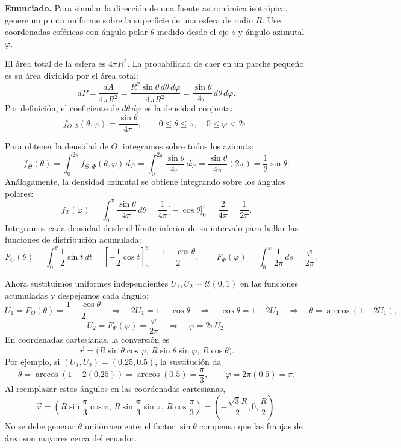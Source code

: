 \textbf{Enunciado.} Para simular la dirección de una fuente astronómica
isotrópica, genere un punto uniforme sobre la superficie de una esfera de
radio $R$. Use coordenadas esféricas con ángulo polar $\theta$ medido desde
el eje $z$ y ángulo azimutal $\varphi$.

El área total de la esfera es $4\pi R^2$. La probabilidad de caer en un
parche pequeño es su área dividida por el área total:
\[
    dP=\frac{dA}{4\pi R^2}
    =\frac{R^2\sin\theta\,d\theta\,d\varphi}{4\pi R^2}
    =\frac{\sin\theta}{4\pi}\,d\theta\,d\varphi.
\]
Por definición, el coeficiente de $d\theta\,d\varphi$ es la densidad conjunta:
\[
    f_{\Theta,\Phi}(\theta,\varphi)=\frac{\sin\theta}{4\pi},
    \qquad 0\leq\theta\leq\pi,\quad 0\leq\varphi<2\pi.
\]

Para obtener la densidad de $\Theta$, integramos sobre todos los azimuts:
\[
    f_\Theta(\theta)
    =\int_0^{2\pi}f_{\Theta,\Phi}(\theta,\varphi)\,d\varphi
    =\int_0^{2\pi}\frac{\sin\theta}{4\pi}\,d\varphi
    =\frac{\sin\theta}{4\pi}(2\pi)
    =\frac{1}{2}\sin\theta.
\]
Análogamente, la densidad azimutal se obtiene integrando sobre los ángulos
polares:
\[
    f_\Phi(\varphi)
    =\int_0^\pi\frac{\sin\theta}{4\pi}\,d\theta
    =\frac{1}{4\pi}\bigl[-\cos\theta\bigr]_0^\pi
    =\frac{2}{4\pi}
    =\frac{1}{2\pi}.
\]
Integramos cada densidad desde el límite inferior de su intervalo para hallar
las funciones de distribución acumulada:
\[
    F_\Theta(\theta)
    =\int_0^\theta\frac{1}{2}\sin t\,dt
    =\left[-\frac{1}{2}\cos t\right]_0^\theta
    =\frac{1-\cos\theta}{2},
    \qquad
    F_\Phi(\varphi)
    =\int_0^\varphi\frac{1}{2\pi}\,ds
    =\frac{\varphi}{2\pi}.
\]

Ahora sustituimos uniformes independientes $U_1,U_2\sim\mathcal{U}(0,1)$ en
las funciones acumuladas y despejamos cada ángulo:
\[
    U_1=F_\Theta(\theta)=\frac{1-\cos\theta}{2}
    \quad\Longrightarrow\quad
    2U_1=1-\cos\theta
    \quad\Longrightarrow\quad
    \cos\theta=1-2U_1
    \quad\Longrightarrow\quad
    \theta=\arccos(1-2U_1),
\]
\[
    U_2=F_\Phi(\varphi)=\frac{\varphi}{2\pi}
    \quad\Longrightarrow\quad
    \varphi=2\pi U_2.
\]
En coordenadas cartesianas, la conversión es
\[
    \vec{r}
    =\bigl(R\sin\theta\cos\varphi,\,
           R\sin\theta\sin\varphi,\,R\cos\theta\bigr).
\]
Por ejemplo, si $(U_1,U_2)=(0.25,0.5)$, la sustitución da
\[
    \theta=\arccos(1-2(0.25))=\arccos(0.5)=\frac{\pi}{3},
    \qquad
    \varphi=2\pi(0.5)=\pi.
\]
Al reemplazar estos ángulos en las coordenadas cartesianas,
\[
    \vec{r}
    =\left(R\sin\frac{\pi}{3}\cos\pi,\,
            R\sin\frac{\pi}{3}\sin\pi,\,
            R\cos\frac{\pi}{3}\right)
    =\left(-\frac{\sqrt{3}R}{2},0,\frac{R}{2}\right).
\]
No se debe generar $\theta$ uniformemente: el factor $\sin\theta$ compensa
que las franjas de área son mayores cerca del ecuador.

